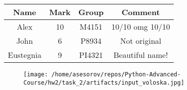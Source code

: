 \documentclass{article}
\begin{document}
\begin{tabular}{|c|c|c|c|}
\hline
Name & Mark & Group & Comment \\
\hline
Alex & 10 & M4151 & 10/10 omg 10/10 \\
\hline
John & 6 & P8934 & Not original \\
\hline
Eustegnia & 9 & PI4321 & Beautiful name! \\
\hline
\end{tabular}
\begin{figure}[h]
\centering
\texttt{[image: /home/asesorov/repos/Python-Advanced-Course/hw2/task\_2/artifacts/input\_voloska.jpg]}
\end{figure}
\end{document}

